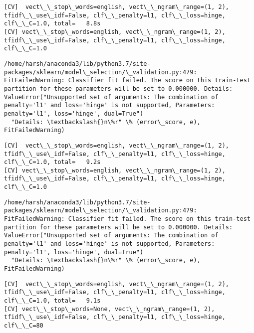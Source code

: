 \documentclass[11pt]{article}
\begin{document}
    \begin{Verbatim}[commandchars=\\\{\}]
[CV]  vect\_\_stop\_words=english, vect\_\_ngram\_range=(1, 2), tfidf\_\_use\_idf=False, clf\_\_penalty=l1, clf\_\_loss=hinge, clf\_\_C=1.0, total=   8.8s
[CV] vect\_\_stop\_words=english, vect\_\_ngram\_range=(1, 2), tfidf\_\_use\_idf=False, clf\_\_penalty=l1, clf\_\_loss=hinge, clf\_\_C=1.0 

    \end{Verbatim}

    \begin{Verbatim}[commandchars=\\\{\}]
/home/harsh/anaconda3/lib/python3.7/site-packages/sklearn/model\_selection/\_validation.py:479: FitFailedWarning: Classifier fit failed. The score on this train-test partition for these parameters will be set to 0.000000. Details: 
ValueError("Unsupported set of arguments: The combination of penalty='l1' and loss='hinge' is not supported, Parameters: penalty='l1', loss='hinge', dual=True")
  "Details: \textbackslash{}n\%r" \% (error\_score, e), FitFailedWarning)

    \end{Verbatim}

    \begin{Verbatim}[commandchars=\\\{\}]
[CV]  vect\_\_stop\_words=english, vect\_\_ngram\_range=(1, 2), tfidf\_\_use\_idf=False, clf\_\_penalty=l1, clf\_\_loss=hinge, clf\_\_C=1.0, total=   9.2s
[CV] vect\_\_stop\_words=english, vect\_\_ngram\_range=(1, 2), tfidf\_\_use\_idf=False, clf\_\_penalty=l1, clf\_\_loss=hinge, clf\_\_C=1.0 

    \end{Verbatim}

    \begin{Verbatim}[commandchars=\\\{\}]
/home/harsh/anaconda3/lib/python3.7/site-packages/sklearn/model\_selection/\_validation.py:479: FitFailedWarning: Classifier fit failed. The score on this train-test partition for these parameters will be set to 0.000000. Details: 
ValueError("Unsupported set of arguments: The combination of penalty='l1' and loss='hinge' is not supported, Parameters: penalty='l1', loss='hinge', dual=True")
  "Details: \textbackslash{}n\%r" \% (error\_score, e), FitFailedWarning)

    \end{Verbatim}

    \begin{Verbatim}[commandchars=\\\{\}]
[CV]  vect\_\_stop\_words=english, vect\_\_ngram\_range=(1, 2), tfidf\_\_use\_idf=False, clf\_\_penalty=l1, clf\_\_loss=hinge, clf\_\_C=1.0, total=   9.1s
[CV] vect\_\_stop\_words=None, vect\_\_ngram\_range=(1, 2), tfidf\_\_use\_idf=False, clf\_\_penalty=l1, clf\_\_loss=hinge, clf\_\_C=80 

    \end{Verbatim}
\end{document}
